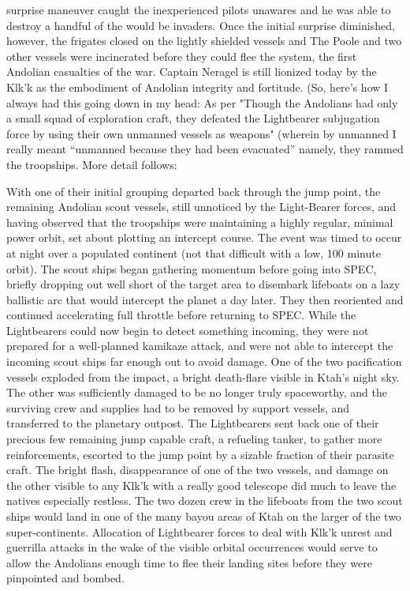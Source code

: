 \begin{itemize}
surprise maneuver caught the inexperienced pilots unawares and he was
able to destroy a handful of the would be invaders.  Once the initial
surprise diminished, however, the frigates closed on the lightly
shielded vessels and The Poole and two other vessels were incinerated
before they could flee the system, the first Andolian casualties of
the war.  Captain Neragel is still lionized today by the Klk'k as the
embodiment of Andolian integrity and fortitude.  (So, here's how I
always had this going down in my head: As per "Though the Andolians
had only a small squad of exploration craft, they defeated the
Lightbearer subjugation force by using their own unmanned vessels as
weapons" (wherein by unmanned I really meant ``unmanned because they
had been evacuated'' namely, they rammed the
troopships. More detail follows:

	With one of their initial grouping departed back through the
	jump point, the remaining Andolian scout vessels, still
	unnoticed by the Light-Bearer forces, and having observed that
	the troopships were maintaining a highly regular, minimal
	power orbit, set about plotting an intercept course. The event
	was timed to occur at night over a populated continent (not
	that difficult with a low, 100 minute orbit). The scout ships
	began gathering momentum before going into SPEC, briefly
	dropping out well short of the target area to disembark
	lifeboats on a lazy ballistic arc that would intercept the
	planet a day later. They then reoriented and continued
	accelerating full throttle before returning to SPEC. While the
	Lightbearers could now begin to detect something incoming,
	they were not prepared for a well-planned kamikaze attack, and
	were not able to intercept the incoming scout ships far enough
	out to avoid damage. One of the two pacification vessels
	exploded from the impact, a bright death-flare visible in Ktah's
	night sky. The other was sufficiently damaged to be no
	longer truly spaceworthy, and the surviving crew and supplies
	had to be removed by support vessels, and transferred to the
	planetary outpost. The Lightbearers sent back one of their
	precious few remaining jump capable craft, a refueling tanker,
	to gather more reinforcements, escorted to the jump point by a
	sizable fraction of their parasite craft. The bright flash,
	disappearance of one of the two vessels, and damage on the
	other visible to any Klk'k with a really good telescope did
	much to leave the natives especially restless. The two dozen
	crew in the lifeboats from the two scout ships would land in
	one of the many bayou areas of Ktah on the larger of the two
	super-continents. Allocation of Lightbearer forces to deal
	with Klk'k unrest and guerrilla attacks in the wake of the
	visible orbital occurrences would serve to allow the Andolians
	enough time to flee their landing sites before they were
	pinpointed and bombed.


\end{itemize}
